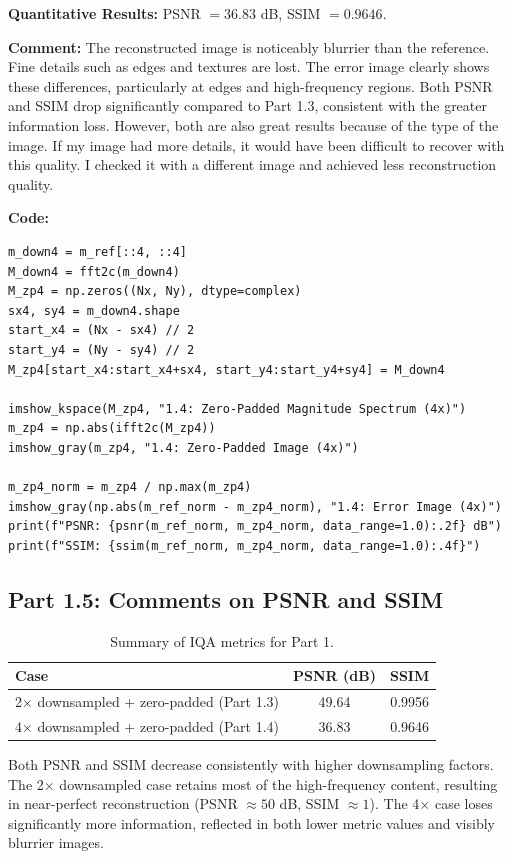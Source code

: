 \documentclass[12pt]{article}
\begin{document}
\textbf{Quantitative Results:} PSNR $= 36.83$ dB, SSIM $= 0.9646$.

\textbf{Comment:} The reconstructed image is noticeably blurrier than the reference. Fine details such as edges and textures are lost. The error image clearly shows these differences, particularly at edges and high-frequency regions. Both PSNR and SSIM drop significantly compared to Part 1.3, consistent with the greater information loss. However, both are also great results because of the type of the image. If my image had more details, it would have been difficult to recover with this quality. I checked it with a different image and achieved less reconstruction quality. 

\textbf{Code:}
\begin{lstlisting}
m_down4 = m_ref[::4, ::4]
M_down4 = fft2c(m_down4)
M_zp4 = np.zeros((Nx, Ny), dtype=complex)
sx4, sy4 = m_down4.shape
start_x4 = (Nx - sx4) // 2
start_y4 = (Ny - sy4) // 2
M_zp4[start_x4:start_x4+sx4, start_y4:start_y4+sy4] = M_down4

imshow_kspace(M_zp4, "1.4: Zero-Padded Magnitude Spectrum (4x)")
m_zp4 = np.abs(ifft2c(M_zp4))
imshow_gray(m_zp4, "1.4: Zero-Padded Image (4x)")

m_zp4_norm = m_zp4 / np.max(m_zp4)
imshow_gray(np.abs(m_ref_norm - m_zp4_norm), "1.4: Error Image (4x)")
print(f"PSNR: {psnr(m_ref_norm, m_zp4_norm, data_range=1.0):.2f} dB")
print(f"SSIM: {ssim(m_ref_norm, m_zp4_norm, data_range=1.0):.4f}")
\end{lstlisting}

\subsection{Part 1.5: Comments on PSNR and SSIM}

\begin{table}[H]
\centering
\begin{tabular}{|l|c|c|}
\hline
\textbf{Case} & \textbf{PSNR (dB)} & \textbf{SSIM} \\
\hline
2$\times$ downsampled + zero-padded (Part 1.3) & 49.64 & 0.9956 \\
4$\times$ downsampled + zero-padded (Part 1.4) & 36.83 & 0.9646 \\
\hline
\end{tabular}
\caption{Summary of IQA metrics for Part 1.}
\label{tab:p1_iqa}
\end{table}

Both PSNR and SSIM decrease consistently with higher downsampling factors. The 2$\times$ downsampled case retains most of the high-frequency content, resulting in near-perfect reconstruction (PSNR $\approx 50$ dB, SSIM $\approx 1$). The 4$\times$ case loses significantly more information, reflected in both lower metric values and visibly blurrier images.
\end{document}
